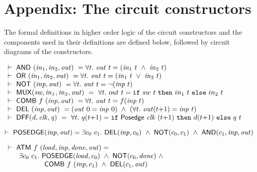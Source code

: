 \newpage
\section*{Appendix: The circuit constructors}
\label{CircuitConstructors}
\vspace*{-3mm}

The formal definitions in higher order logic of the circuit
constructors and the components used in their definitions are defined
below, followed by circuit diagrams of the constructors.

\begin{footnotesize}

\medskip
$
\begin{array}{l}
\TURNST\ \DEF{AND}\ (\sVAR{in}{1},\sVAR{in}{2},\VAR{out}) ~ = 
   \forall t.\ \VAR{out}\ t = (\sVAR{in}{1}\ t\ \AND\ \sVAR{in}{2}\ t)\\
\TURNST\ \DEF{OR}\ (\sVAR{in}{1},\sVAR{in}{2},\VAR{out}) ~ =
   \forall t.\ \VAR{out}\ t = (\sVAR{in}{1}\ t\ \OR\ \sVAR{in}{2}\ t)\\
\TURNST\ \DEF{NOT}\ (\VAR{inp},\VAR{out}) ~ = 
   \forall t.\ \VAR{out}\ t = \NOT(\VAR{inp}\ t)\\
\TURNST\ \DEF{MUX} (\VAR{sw,in_1,in_2,out})~ =~
 \forall t.\ out~t =  \IF{sw~t}{in_1~t}{in_2~t}\\
\TURNST\ \DEF{COMB}\ f\ \VAR{(inp,out)} ~ = \forall t.\ \VAR{out}\ t = f (\VAR{inp}\ t)\\
\TURNST\ \DEF{DEL}\ (\VAR{inp},\VAR{out}) ~ = 
    (\VAR{out}\ 0 = \VAR{inp}\ 0)\ \AND\ 
    (\forall t.\ \VAR{out} (t{+}1) = \VAR{inp}\ t)\\
\TURNST\ \DEF{DFF} (\VAR{d,clk,q})~ =~
 \forall t.\ q (t{+}1) =  \IF{\DEF{Posedge}\ \VAR{clk}\ (t{+}1)}{d (t{+}1)}{q\ t}
\end{array}
$
 

$
\vdash\ \mathsf{POSEDGE} (\mathit{inp},\mathit{out}) = 
    \exists c_0~ c_1.\ \mathsf{DEL} (\mathit{inp},c_0)\ \wedge\
                  \mathsf{NOT} (c_0, c_1)\ \wedge\ \mathsf{AND} (c_1,\mathit{inp},\mathit{out})
$

\smallskip


$
\begin{array}{l}
\TURNST\ \DEF{ATM}\ f\ (\VAR{load,inp,done,out}) =\\
\phantom{\TURNST\ ~~}    \exists c_0~ c_1.\ \DEF{POSEDGE} (\VAR{load}, c_0)\ \AND \ 
\DEF{NOT} (c_0, \VAR{done})\ \AND\\
\phantom{\TURNST\ ~~\exists c_0, c_1.\ }  \DEF{COMB}\ f\ (\VAR{inp},c_1)\ \AND\ \DEF{DEL} (c_1,\VAR{out})
\end{array}
$


\end{footnotesize}
